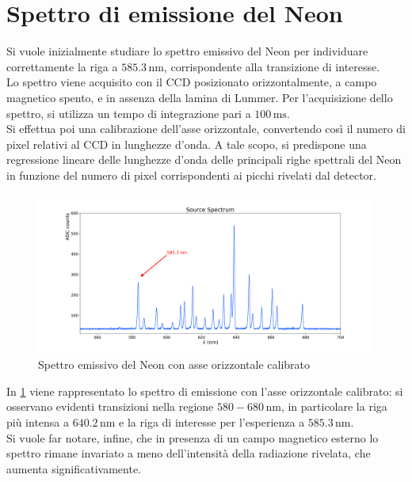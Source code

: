 \documentclass[twocolumn,10pt]{asme2ej}
\begin{document}
\section{Spettro di emissione del Neon}\label{s:neon}

Si vuole inizialmente studiare lo spettro emissivo del Neon per individuare correttamente la riga a $585.3
\,\si{\nano\metre}$, corrispondente alla transizione di interesse.\\
Lo spettro viene acquisito con il CCD posizionato orizzontalmente, a campo magnetico spento, e in assenza della lamina
di Lummer. Per l'acquisizione dello spettro, si utilizza un tempo di integrazione pari a $100 \,\si{\milli\second}$. \\
Si effettua poi una calibrazione dell'asse orizzontale, convertendo così il numero di pixel relativi al CCD in lunghezze
d'onda. A tale scopo, si predispone una regressione lineare delle lunghezze d'onda delle principali righe spettrali del
Neon in funzione del numero di pixel corrispondenti ai picchi rivelati dal detector. 
 
\begin{figure}
    \centering
    \includegraphics[width=\textwidth]{../Spectrum/SpectrumPlots/spettro1d_Boff.png}
    \caption{Spettro emissivo del Neon con asse orizzontale calibrato}
    \label{i:spettro1d}
\end{figure}


In \figurename\ref{i:spettro1d} viene rappresentato lo spettro di emissione con l'asse orizzontale calibrato: si
osservano evidenti transizioni nella regione $580-680 \,\si{\nano\metre}$, in particolare la riga più intensa a $640.2
\,\si{\nano\metre}$ e la riga di interesse per l'esperienza a $585.3 \,\si{\nano\metre}$.\\
Si vuole far notare, infine, che in presenza di un campo magnetico esterno lo spettro rimane invariato a meno
dell'intensità della radiazione rivelata, che aumenta significativamente. 
\end{document}
